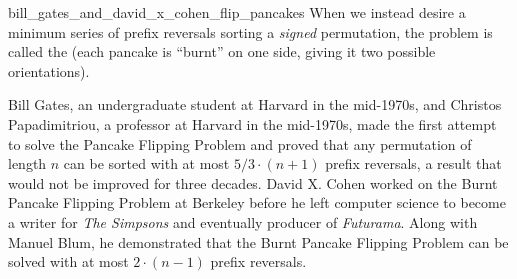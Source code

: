 \begin{detour}{bill_gates_and_david_x_cohen_flip_pancakes}
When we instead desire a minimum series of prefix reversals sorting a \emph{signed} permutation, the problem is called the  (each pancake is ``burnt'' on one side, giving it two possible orientations).\\

\begin{qbox}\end{qbox}

\noindent Bill Gates, an undergraduate student at Harvard in the mid-1970s, and Christos Papadimitriou, a professor at Harvard in the mid-1970s, made the first attempt to solve the Pancake Flipping Problem and proved that any permutation of length $n$ can be sorted with at most $5/3 \cdot (n + 1)$ prefix reversals, a result that would not be improved for three decades. David X. Cohen worked on the Burnt Pancake Flipping Problem at Berkeley before he left computer science to become a writer for \textit{The Simpsons} and eventually producer of \textit{Futurama}. Along with Manuel Blum, he demonstrated that the Burnt Pancake Flipping Problem can be solved with at most $2 \cdot (n - 1)$ prefix reversals.

\end{detour}

